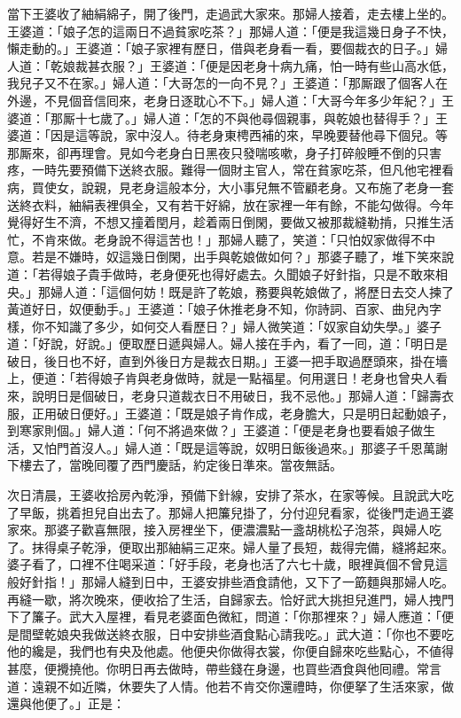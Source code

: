 當下王婆收了紬絹綿子，開了後門，走過武大家來。那婦人接着，走去樓上坐的。王婆道：「娘子怎的這兩日不過貧家吃茶？」那婦人道：「便是我這幾日身子不快，懶走動的。」王婆道：「娘子家裡有歷日，借與老身看一看，要個裁衣的日子。」婦人道：「乾娘裁甚衣服？」王婆道：「便是因老身十病九痛，怕一時有些山高水低，我兒子又不在家。」婦人道：「大哥怎的一向不見？」王婆道：「那厮跟了個客人在外邊，不見個音信囘來，老身日逐耽心不下。」婦人道：「大哥今年多少年紀？」王婆道：「那厮十七歲了。」婦人道：「怎的不與他尋個親事，{}與乾娘也替得手？」王婆道：「因是這等說，家中沒人。待老身東梬西補的來，早晚要替他尋下個兒。等那厮來，卻再理會。見如今老身白日黑夜只發喘咳嗽，身子打碎般睡不倒的只害疼，一時先要預備下送終衣服。難得一個財主官人，常在貧家吃茶，但凡他宅裡看病，買使女，說親，見老身這般本分，大小事兒無不管顧老身。又布施了老身一套送終衣料，{}紬絹表裡俱全，又有若干好綿，放在家裡一年有餘，不能勾做得。今年覺得好生不濟，不想又撞着閏月，趁着兩日倒閑，要做又被那裁縫勒掯，只推生活忙，不肯來做。老身說不得這苦也！」那婦人聽了，笑道：「只怕奴家做得不中意。{}若是不嫌時，奴這幾日倒閑，出手與乾娘做如何？」那婆子聽了，堆下笑來說道：「若得娘子貴手做時，老身便死也得好處去。久聞娘子好針指，只是不敢來相央。」那婦人道：「這個何妨！既是許了乾娘，務要與乾娘做了，將歷日去交人揀了黃道好日，奴便動手。」王婆道：「娘子休推老身不知，你詩詞、百家、曲兒內字樣，你不知識了多少，如何交人看歷日？」婦人微笑道：「奴家自幼失學。」婆子道：「好說，好說。」便取歷日遞與婦人。婦人接在手內，看了一囘，道：「明日是破日，後日也不好，直到外後日方是裁衣日期。」王婆一把手取過歷頭來，掛在墻上，便道：「若得娘子肯與老身做時，就是一點福星。{}何用選日！老身也曾央人看來，說明日是個破日，老身只道裁衣日不用破日，我不忌他。」那婦人道：「歸壽衣服，正用破日便好。」王婆道：「既是娘子肯作成，老身膽大，只是明日起動娘子，到寒家則個。」婦人道：「何不將過來做？」王婆道：「便是老身也要看娘子做生活，又怕門首沒人。」婦人道：「既是這等說，奴明日飯後過來。」那婆子千恩萬謝下樓去了，當晚囘覆了西門慶話，約定後日準來。當夜無話。

次日清晨，王婆收拾房內乾淨，預備下針線，安排了茶水，在家等候。且說武大吃了早飯，挑着担兒自出去了。那婦人把簾兒掛了，分付迎兒看家，從後門走過王婆家來。那婆子歡喜無限，接入房裡坐下，便濃濃點一盞胡桃松子泡茶，與婦人吃了。抹得桌子乾淨，便取出那紬絹三疋來。婦人量了長短，裁得完備，縫將起來。婆子看了，口裡不住喝采道：「好手段，老身也活了六七十歲，眼裡眞個不曾見這般好針指！」那婦人縫到日中，王婆安排些酒食請他，又下了一筯麵與那婦人吃。再縫一歇，將次晚來，便收拾了生活，自歸家去。恰好武大挑担兒進門，婦人拽門下了簾子。武大入屋裡，看見老婆面色微紅，問道：「你那裡來？」婦人應道：「便是間壁乾娘央我做送終衣服，日中安排些酒食點心請我吃。」武大道：「你也不要吃他的纔是，我們也有央及他處。他便央你做得衣裳，你便自歸來吃些點心，不値得甚麼，便攪撓他。你明日再去做時，帶些錢在身邊，也買些酒食與他囘禮。常言道：遠親不如近隣，休要失了人情。他若不肯交你還禮時，你便拏了生活來家，做還與他便了。」正是：

